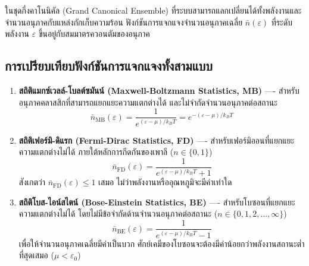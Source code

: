 ในชุดกึ่งคาโนนิคัล (Grand Canonical Ensemble) ที่ระบบสามารถแลกเปลี่ยนได้ทั้งพลังงานและจำนวนอนุภาคกับแหล่งกักเก็บความร้อน ฟังก์ชันการแจกแจงจำนวนอนุภาคเฉลี่ย $\bar{n}(\varepsilon)$ ที่ระดับพลังงาน $\varepsilon$ ขึ้นอยู่กับสมมาตรควอนตัมของอนุภาค

\subsection{การเปรียบเทียบฟังก์ชันการแจกแจงทั้งสามแบบ}
\begin{enumerate}
    \item \textbf{สถิติแมกซ์เวลล์-โบลต์ซมันน์ (Maxwell-Boltzmann Statistics, MB)} ---- สำหรับอนุภาคคลาสสิกที่สามารถแยกแยะความแตกต่างได้ และไม่จำกัดจำนวนอนุภาคต่อสถานะ
    \begin{equation}
    \bar{n}_{\text{MB}}(\varepsilon) = \frac{1}{e^{(\varepsilon - \mu)/k_B T}} = e^{-(\varepsilon - \mu)/k_B T}
    \label{eq:mb_dist}
    \end{equation}
    \item \textbf{สถิติเฟอร์มิ-ดิแรก (Fermi-Dirac Statistics, FD)} ---- สำหรับเฟอร์มิออนที่แยกแยะความแตกต่างไม่ได้ ภายใต้หลักการกีดกันของเพาลี ($n \in \{0, 1\}$)
    \begin{equation}
    \bar{n}_{\text{FD}}(\varepsilon) = \frac{1}{e^{(\varepsilon - \mu)/k_B T} + 1}
    \label{eq:fd_dist}
    \end{equation}
    สังเกตว่า $\bar{n}_{\text{FD}}(\varepsilon) \le 1$ เสมอ ไม่ว่าพลังงานหรืออุณหภูมิจะมีค่าเท่าใด
    \item \textbf{สถิติโบส-ไอน์สไตน์ (Bose-Einstein Statistics, BE)} ---- สำหรับโบซอนที่แยกแยะความแตกต่างไม่ได้ โดยไม่มีข้อจำกัดด้านจำนวนอนุภาคต่อสถานะ ($n \in \{0, 1, 2, \dots, \infty\}$)
    \begin{equation}
    \bar{n}_{\text{BE}}(\varepsilon) = \frac{1}{e^{(\varepsilon - \mu)/k_B T} - 1}
    \label{eq:be_dist}
    \end{equation}
    เพื่อให้จำนวนอนุภาคเฉลี่ยมีค่าเป็นบวก ศักย์เคมีของโบซอนจะต้องมีค่าน้อยกว่าพลังงานสถานะต่ำที่สุดเสมอ ($\mu < \varepsilon_0$)
\end{enumerate}

